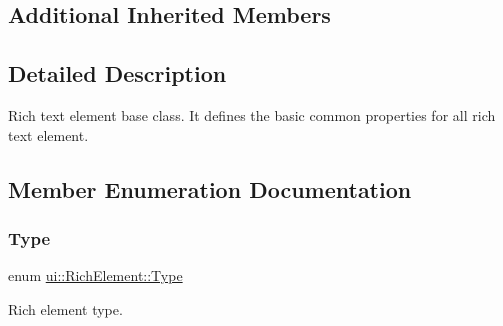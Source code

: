 \subsection*{Additional Inherited Members}


\subsection{Detailed Description}
Rich text element base class. It defines the basic common properties for all rich text element. 

\subsection{Member Enumeration Documentation}
\mbox{\label{classui_1_1RichElement_a6840f6ae352b476f553659d9ecbf48c3}} 
\subsubsection{\texorpdfstring{Type}{Type}\hspace{0.1cm}{\footnotesize\ttfamily [1/2]}}
{\footnotesize\ttfamily enum \hyperlink{classui_1_1RichElement_a6840f6ae352b476f553659d9ecbf48c3}{ui\+::\+Rich\+Element\+::\+Type}\hspace{0.3cm}{\ttfamily [strong]}}



Rich element type. 


